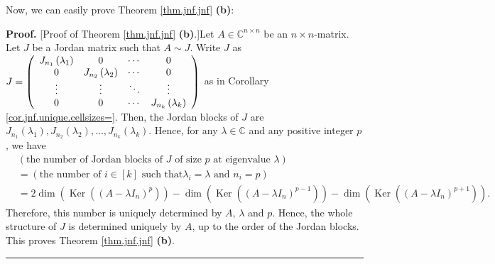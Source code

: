 \documentclass[numbers=enddot,12pt,final,onecolumn,notitlepage]{scrartcl}%
\numberwithin{exer}{subsection}
\theoremstyle{definition}
\newenvironment{proof}[1][Proof]{\noindent\textbf{#1.} }{\ \rule{0.5em}{0.5em}}
\begin{document}
Now, we can easily prove Theorem \ref{thm.jnf.jnf} \textbf{(b)}:

\begin{proof}
[Proof of Theorem \ref{thm.jnf.jnf} \textbf{(b)}.]Let $A\in\mathbb{C}^{n\times
n}$ be an $n\times n$-matrix. Let $J$ be a Jordan matrix such that $A\sim J$.
Write $J$ as $J=\left(
\begin{array}
[c]{cccc}%
J_{n_{1}}\left(  \lambda_{1}\right)  & 0 & \cdots & 0\\
0 & J_{n_{2}}\left(  \lambda_{2}\right)  & \cdots & 0\\
\vdots & \vdots & \ddots & \vdots\\
0 & 0 & \cdots & J_{n_{k}}\left(  \lambda_{k}\right)
\end{array}
\right)  $ as in Corollary \ref{cor.jnf.unique.cellsizes=}. Then, the Jordan
blocks of $J$ are $J_{n_{1}}\left(  \lambda_{1}\right)  ,J_{n_{2}}\left(
\lambda_{2}\right)  ,\ldots,J_{n_{k}}\left(  \lambda_{k}\right)  $. Hence, for
any $\lambda\in\mathbb{C}$ and any positive integer $p$, we have%
\begin{align*}
&  \left(  \text{the number of Jordan blocks of }J\text{ of size }p\text{ at
eigenvalue }\lambda\right) \\
&  =\left(  \text{the number of }i\in\left[  k\right]  \text{ such that
}\lambda_{i}=\lambda\text{ and }n_{i}=p\right) \\
&  =2\dim\left(  \operatorname*{Ker}\left(  \left(  A-\lambda I_{n}\right)
^{p}\right)  \right)  -\dim\left(  \operatorname*{Ker}\left(  \left(
A-\lambda I_{n}\right)  ^{p-1}\right)  \right)  -\dim\left(
\operatorname*{Ker}\left(  \left(  A-\lambda I_{n}\right)  ^{p+1}\right)
\right)  .
\end{align*}
Therefore, this number is uniquely determined by $A$, $\lambda$ and $p$.
Hence, the whole structure of $J$ is determined uniquely by $A$, up to the
order of the Jordan blocks. This proves Theorem \ref{thm.jnf.jnf} \textbf{(b)}.
\end{proof}
\end{document}
